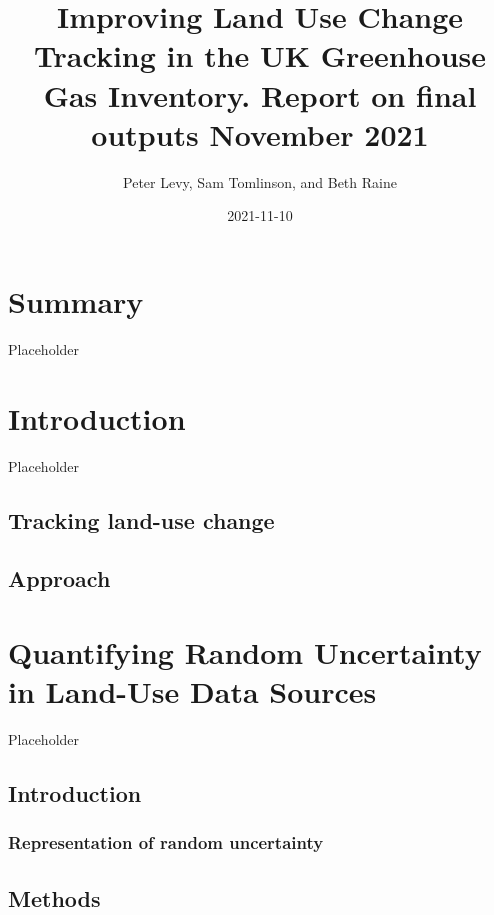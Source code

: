 \documentclass[
]{book}
\title{Improving Land Use Change Tracking in the UK Greenhouse Gas Inventory. Report on final outputs November 2021}
\author{Peter Levy, Sam Tomlinson, and Beth Raine}
\date{2021-11-10}
\begin{document}
\maketitle

{
\setcounter{tocdepth}{1}
\tableofcontents
}
\hypertarget{summary}{%
\chapter*{Summary}\label{summary}}

Placeholder

\hypertarget{introduction}{%
\chapter{Introduction}\label{introduction}}

Placeholder

\hypertarget{tracking-land-use-change}{%
\section{Tracking land-use change}\label{tracking-land-use-change}}

\hypertarget{approach}{%
\section{Approach}\label{approach}}

\hypertarget{quantifying-random-uncertainty-in-land-use-data-sources}{%
\chapter{Quantifying Random Uncertainty in Land-Use Data Sources}\label{quantifying-random-uncertainty-in-land-use-data-sources}}

Placeholder

\hypertarget{introduction-1}{%
\section{Introduction}\label{introduction-1}}

\hypertarget{representation-of-random-uncertainty}{%
\subsection{Representation of random uncertainty}\label{representation-of-random-uncertainty}}

\hypertarget{methods}{%
\section{Methods}\label{methods}}
\end{document}
